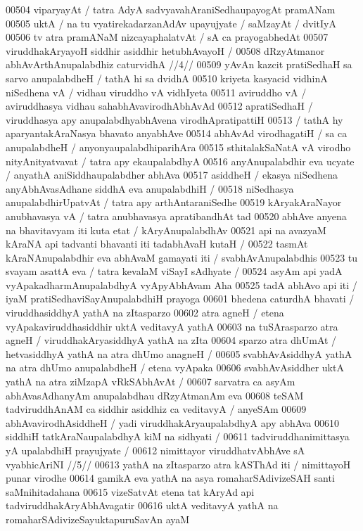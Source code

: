 00504 viparyayAt / tatra AdyA sadvyavahAraniSedhaupayogAt pramANam  
00505 uktA / na tu vyatirekadarzanAdAv upayujyate / saMzayAt / dvitIyA 
00506 tv atra pramANaM nizcayaphalatvAt / sA ca prayogabhedAt 
00507 	viruddhakAryayoH siddhir asiddhir hetubhAvayoH /  
00508 	dRzyAtmanor abhAvArthAnupalabdhiz caturvidhA //4//
00509 yAvAn kazcit pratiSedhaH sa sarvo anupalabdheH / tathA hi sa dvidhA
00510 kriyeta kasyacid vidhinA niSedhena vA / vidhau viruddho vA  vidhIyeta 
00511 aviruddho vA / aviruddhasya vidhau sahabhAvavirodhAbhAvAd 
00512 apratiSedhaH / viruddhasya apy anupalabdhyabhAvena virodhApratipattiH 
00513 / tathA hy aparyantakAraNasya bhavato anyabhAve 
00514 abhAvAd virodhagatiH / sa ca anupalabdheH / anyonyaupalabdhiparihAra
00515 sthitalakSaNatA vA virodho nityAnityatvavat / tatra apy  ekaupalabdhyA
00516 anyAnupalabdhir eva ucyate / anyathA aniSiddhaupalabdher abhAva  
00517 asiddheH / ekasya niSedhena anyAbhAvasAdhane siddhA eva anupalabdhiH /
00518 niSedhasya anupalabdhirUpatvAt / tatra apy arthAntaraniSedhe  
00519 kAryakAraNayor anubhavasya vA / tatra anubhavasya apratibandhAt tad 
00520 abhAve anyena na bhavitavyam iti kuta etat / kAryAnupalabdhAv  
00521 api na avazyaM kAraNA api tadvanti bhavanti iti tadabhAvaH kutaH / 
00522 tasmAt kAraNAnupalabdhir eva abhAvaM gamayati iti / svabhAvAnupalabdhis
00523 tu svayam asattA eva / tatra kevalaM viSayI sAdhyate /  
00524 asyAm api yadA vyApakadharmAnupalabdhyA vyApyAbhAvam Aha
00525 tadA abhAvo api iti / iyaM pratiSedhaviSayAnupalabdhiH prayoga
00601 bhedena caturdhA bhavati / viruddhasiddhyA yathA na zItasparzo
00602 atra agneH / etena vyApakaviruddhasiddhir uktA veditavyA yathA
00603 na tuSArasparzo atra agneH / viruddhakAryasiddhyA yathA na zIta  
00604 sparzo atra dhUmAt / hetvasiddhyA yathA na atra dhUmo anagneH /  
00605 svabhAvAsiddhyA yathA na atra dhUmo anupalabdheH / etena vyApaka  
00606 svabhAvAsiddher uktA yathA na atra ziMzapA vRkSAbhAvAt / 
00607 sarvatra ca asyAm abhAvasAdhanyAm anupalabdhau dRzyAtmanAm eva
00608 teSAM tadviruddhAnAM ca siddhir asiddhiz ca veditavyA / anyeSAm  
00609 abhAvavirodhAsiddheH / yadi viruddhakAryaupalabdhyA apy  abhAva 
00610 siddhiH tatkAraNaupalabdhyA kiM na sidhyati / 
00611 	tadviruddhanimittasya yA upalabdhiH prayujyate /
00612 	nimittayor viruddhatvAbhAve sA vyabhicAriNI //5//  
00613 yathA na zItasparzo atra kASThAd iti / nimittayoH punar virodhe
00614 gamikA eva yathA na asya romaharSAdivizeSAH santi saMnihitadahana
00615 vizeSatvAt etena tat kAryAd api tadviruddhakAryAbhAvagatir
00616 uktA veditavyA yathA na romaharSAdivizeSayuktapuruSavAn ayaM
